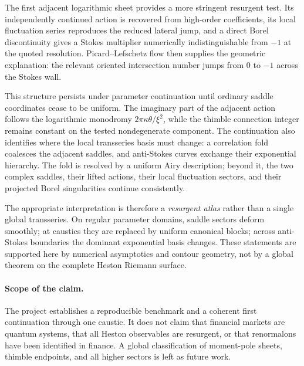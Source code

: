 \documentclass[11pt]{article}
\begin{document}
The first adjacent logarithmic sheet provides a more stringent resurgent test.  Its independently continued action is recovered from high-order coefficients, its local fluctuation series reproduces the reduced lateral jump, and a direct Borel discontinuity gives a Stokes multiplier numerically indistinguishable from $-1$ at the quoted resolution.  Picard--Lefschetz flow then supplies the geometric explanation: the relevant oriented intersection number jumps from $0$ to $-1$ across the Stokes wall.

This structure persists under parameter continuation until ordinary saddle coordinates cease to be uniform.  The imaginary part of the adjacent action follows the logarithmic monodromy $2\pi\kappa\theta/\xi^2$, while the thimble connection integer remains constant on the tested nondegenerate component.  The continuation also identifies where the local transseries basis must change: a correlation fold coalesces the adjacent saddles, and anti-Stokes curves exchange their exponential hierarchy.  The fold is resolved by a uniform Airy description; beyond it, the two complex saddles, their lifted actions, their local fluctuation sectors, and their projected Borel singularities continue consistently.

The appropriate interpretation is therefore a \emph{resurgent atlas} rather than a single global transseries.  On regular parameter domains, saddle sectors deform smoothly; at caustics they are replaced by uniform canonical blocks; across anti-Stokes boundaries the dominant exponential basis changes.  These statements are supported here by numerical asymptotics and contour geometry, not by a global theorem on the complete Heston Riemann surface.

\paragraph{Scope of the claim.}
The project establishes a reproducible benchmark and a coherent first continuation through one caustic.  It does not claim that financial markets are quantum systems, that all Heston observables are resurgent, or that renormalons have been identified in finance.  A global classification of moment-pole sheets, thimble endpoints, and all higher sectors is left as future work.

\appendix
\end{document}
